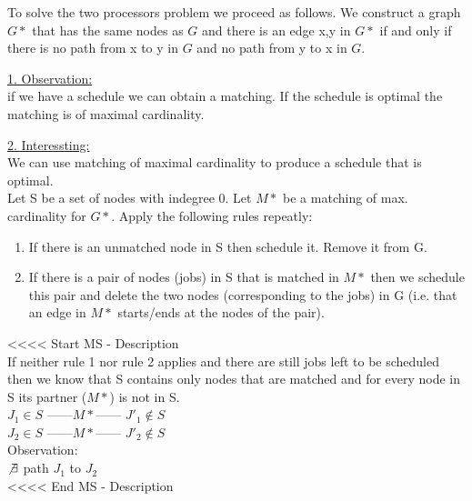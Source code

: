 To solve the two processors problem we proceed as follows. We construct a graph $G*$ that has the same nodes as $G$ and there is an edge {x,y} in $G*$ if and only if there is no path from x to y in $G$ and no path from y to x in $G$.

\underline{1. Observation:}\\
if we have a schedule we can obtain a matching. If the schedule is optimal the matching is of maximal cardinality.

\underline{2. Interessting:}\\
We can use matching of maximal cardinality to produce a schedule that is optimal.\\

Let S be a set of nodes with indegree 0. Let $M*$ be a matching of max. cardinality for $G*$. Apply the following rules repeatly:\\
\begin{enumerate}
  \item If there is an unmatched node in S then schedule it. Remove it from G.
  \item If there is a pair of nodes (jobs) in S that is matched in $M*$ then we schedule this pair and delete the two nodes (corresponding to the jobs) in G (i.e. that an edge in $M*$ starts/ends at the nodes of the pair).
\end{enumerate}


<<<< Start MS - Description\\
If neither rule 1 nor rule 2 applies and there are still jobs left to be scheduled then we know that S contains only nodes that are matched
and for every node in S its partner ($M*$) is not in S.\\

$J{_1} \in S$ ------$M*$------
$J'{_1} \notin S$\\

$J{_2} \in S$ ------$M*$------
$J'{_2} \notin S$\\

Observation:\\
$\not\exists$ path $J_{1}$ to $J_{2}$ \\
<<<< End MS - Description

